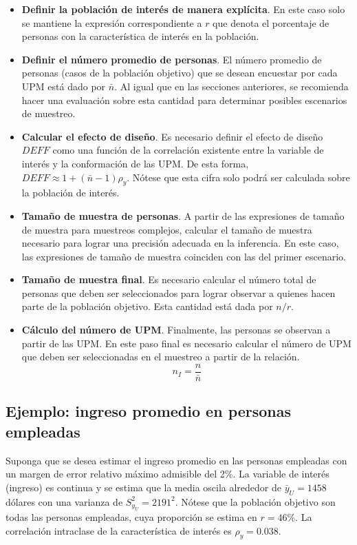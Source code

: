 \documentclass[
  12pt,
  spanish,
]{book}
\begin{document}
\begin{itemize}
\item
  \textbf{Definir la población de interés de manera explícita}. En este caso solo se mantiene la expresión correspondiente a \(r\) que denota el porcentaje de personas con la característica de interés en la población.
\item
  \textbf{Definir el número promedio de personas}. El número promedio de personas (casos de la población objetivo) que se desean encuestar por cada UPM está dado por \(\bar{n}\). Al igual que en las secciones anteriores, se recomienda hacer una evaluación sobre esta cantidad para determinar posibles escenarios de muestreo.
\item
  \textbf{Calcular el efecto de diseño}. Es necesario definir el efecto de diseño \(DEFF\) como una función de la correlación existente entre la variable de interés y la conformación de las UPM. De esta forma, \(DEFF \approx 1 + (\bar{n} - 1)\rho_y\). Nótese que esta cifra solo podrá ser calculada sobre la población de interés.
\item
  \textbf{Tamaño de muestra de personas}. A partir de las expresiones de tamaño de muestra para muestreos complejos, calcular el tamaño de muestra necesario para lograr una precisión adecuada en la inferencia. En este caso, las expresiones de tamaño de muestra coinciden con las del primer escenario.
\item
  \textbf{Tamaño de muestra final}. Es necesario calcular el número total de personas que deben ser seleccionados para lograr observar a quienes hacen parte de la población objetivo. Esta cantidad está dada por \(n / r\).
\item
  \textbf{Cálculo del número de UPM}. Finalmente, las personas se observan a partir de las UPM. En este paso final es necesario calcular el número de UPM que deben ser seleccionadas en el muestreo a partir de la relación.
  \[
  n_{I} = \frac{n}{\bar{n}} 
  \]
\end{itemize}

\hypertarget{ejemplo-ingreso-promedio-en-personas-empleadas}{%
\subsection{Ejemplo: ingreso promedio en personas empleadas}\label{ejemplo-ingreso-promedio-en-personas-empleadas}}

Suponga que se desea estimar el ingreso promedio en las personas empleadas con un margen de error relativo máximo admisible del 2\%. La variable de interés (ingreso) es continua y se estima que la media oscila alrededor de \(\bar{y}_U=1458\) dólares con una varianza de \(S^2_{y_U}=2191^2\). Nótese que la población objetivo son todas las personas empleadas, cuya proporción se estima en \(r = 46\)\%. La correlación intraclase de la característica de interés es \(\rho_y = 0.038\).
\end{document}
